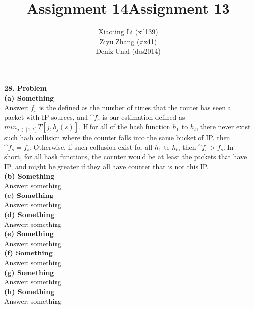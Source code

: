 \documentclass{article}
\title{Assignment 14}
\title{Assignment 13}
\author{Xiaoting Li (xil139) \\
Ziyu Zhang (ziz41) \\
Deniz Unal (des2014)}
\date{}
\begin{document}
\maketitle

\noindent
\textbf{28. Problem}\\ \newline
\textbf{(a) Something} \\ \newline
Answer: $f_s$ is the defined as the number of times that the router has seen a packet with IP sources, and $\^f_s$ is our estimation defined as $min_{j\in[1,t]}{T[j,h_j(s)]}$. If for all of the hash function $h_1$ to $h_t$, there never exist such hash collision where the counter falls into the same bucket of IP, then $\^f_s = f_s$. Otherwise, if such collusion exist for all $h_1$ to $h_t$, then $\^f_s > f_s$. In short, for all hash functions, the counter would be at least the packets that have IP, and might be greater if they all have counter that is not this IP.\\ \newline
\textbf{(b) Something} \\ \newline
Answer: something\\ \newline
\textbf{(c) Something} \\ \newline
Answer: something\\ \newline
\textbf{(d) Something} \\ \newline
Answer: something\\ \newline
\textbf{(e) Something} \\ \newline
Answer: something\\ \newline
\textbf{(f) Something} \\ \newline
Answer: something\\ \newline
\textbf{(g) Something} \\ \newline
Answer: something\\ \newline
\textbf{(h) Something} \\ \newline
Answer: something\\ \newline
\end{document}
